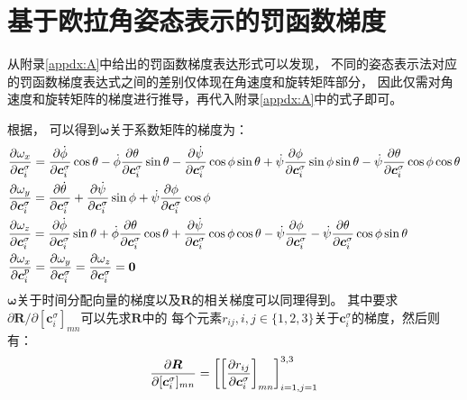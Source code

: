 
\chapter{基于欧拉角姿态表示的罚函数梯度}\label{appdx:B}

从附录\ref{appdx:A}中给出的罚函数梯度表达形式可以发现，
不同的姿态表示法对应的罚函数梯度表达式之间的差别仅体现在角速度和旋转矩阵部分，
因此仅需对角速度和旋转矩阵的梯度进行推导，再代入附录\ref{appdx:A}中的式子即可。

根据，
可以得到$\bm{\omega}$关于系数矩阵的梯度为： 
\begin{align}
    & \frac{\partial{\omega_x}}{\partial{\bm{c}_i^{\sigma}}} = 
    \frac{\partial{\dot{\phi}}}{\partial{\bm{c}_i^{\sigma}}}\cos\theta - 
    \dot{\phi}\frac{\partial{\theta}}{\partial{\bm{c}_i^{\sigma}}}\sin\theta - 
    \frac{\partial{\dot{\psi}}}{\partial{\bm{c}_i^{\sigma}}}\cos\phi\sin\theta + 
    \dot{\psi}\frac{\partial{\phi}}{\partial{\bm{c}_i^{\sigma}}}\sin\phi\sin\theta - 
    \dot{\psi}\frac{\partial{\theta}}{\partial{\bm{c}_i^{\sigma}}}\cos\phi\cos\theta \label{equ:omegax_d_cis} \\
    & \frac{\partial{\omega_y}}{\partial{\bm{c}_i^{\sigma}}} = 
    \frac{\partial{\dot{\theta}}}{\partial{\bm{c}_i^{\sigma}}} + 
    \frac{\partial{\dot{\psi}}}{\partial{\bm{c}_i^{\sigma}}}\sin\phi + 
    \dot{\psi}\frac{\partial{\phi}}{\partial{\bm{c}_i^{\sigma}}}\cos\phi \label{equ:omegay_d_cis} \\
    & \frac{\partial{\omega_z}}{\partial{\bm{c}_i^{\sigma}}} = 
    \frac{\partial{\dot{\phi}}}{\partial{\bm{c}_i^{\sigma}}}\sin\theta + 
    \dot{\phi}\frac{\partial{\theta}}{\partial{\bm{c}_i^{\sigma}}}\cos\theta + 
    \frac{\partial{\dot{\psi}}}{\partial{\bm{c}_i^{\sigma}}}\cos\phi\cos\theta - 
    \dot{\psi}\frac{\partial{\phi}}{\partial{\bm{c}_i^{\sigma}}} - 
    \dot{\psi}\frac{\partial{\theta}}{\partial{\bm{c}_i^{\sigma}}}\cos\phi\sin\theta \label{equ:omegaz_d_cis} \\
    & \frac{\partial{\omega_x}}{\partial{\bm{c}_i^{p}}} = 
    \frac{\partial{\omega_y}}{\partial{\bm{c}_i^{\sigma}}} = 
    \frac{\partial{\omega_z}}{\partial{\bm{c}_i^{\sigma}}} = \textbf{0} \label{equ:omegaxyz_d_cip}
\end{align}
$\bm{\omega}$关于时间分配向量的梯度以及$\bm{R}$的相关梯度可以同理得到。
其中要求${\partial \bm{R}}/{\partial [\bm{c}_i^{\sigma}]_{mn}}$可以先求$\bm{R}$中的 
每个元素$r_{ij},i,j\in\{1,2,3\}$关于$\bm{c}_i^{\sigma}$的梯度，然后则有：
\begin{equation}
    \frac{\partial{\bm{R}}}{\partial{[\bm{c}_i^{\sigma}]_{mn}}} = 
    \left[\left[\frac{\partial{r_{ij}}}{\partial{\bm{c}_i^{\sigma}}}\right]_{mn}\right]_{i=1,j=1}^{3,3}
\end{equation}

